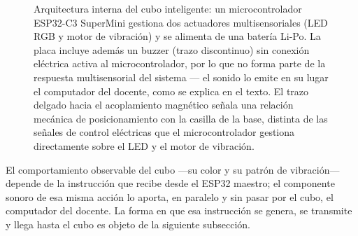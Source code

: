\documentclass{book}
\begin{document}
\begin{figure}[H]
\centering
{}
\caption{Arquitectura interna del cubo inteligente: un microcontrolador
ESP32-C3 SuperMini gestiona dos actuadores multisensoriales (LED
RGB y motor de vibración) y se alimenta de una batería Li-Po. La placa
incluye además un buzzer (trazo discontinuo) sin conexión eléctrica
activa al microcontrolador, por lo que no forma parte de la respuesta
multisensorial del sistema — el sonido lo emite en su lugar el
computador del docente, como se explica en el texto. El trazo delgado
hacia el acoplamiento magnético señala una relación
mecánica de posicionamiento con la casilla de la base, distinta de las
señales de control eléctricas que el microcontrolador gestiona
directamente sobre el LED y el motor de vibración.}
\label{fig:cubo-arquitectura}
\end{figure}

El comportamiento observable del cubo —su color y su patrón de
vibración— depende de la instrucción que recibe desde el ESP32
maestro; el componente sonoro de esa misma acción lo aporta, en
paralelo y sin pasar por el cubo, el computador del docente.
La forma en que esa instrucción se genera, se transmite y llega hasta
el cubo es objeto de la siguiente subsección.
\end{document}
